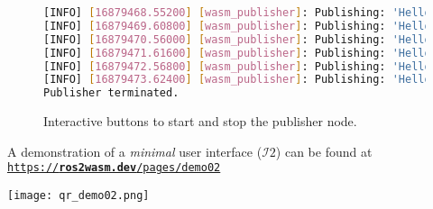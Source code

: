         \vspace{1em}
        \begin{figure}[htbp]
            \centering
            \vspace{1em}
            \begin{lstlisting}[language=Bash]
[INFO] [16879468.55200] [wasm_publisher]: Publishing: 'Hello there! 13'
[INFO] [16879469.60800] [wasm_publisher]: Publishing: 'Hello there! 14'
[INFO] [16879470.56000] [wasm_publisher]: Publishing: 'Hello there! 15'
[INFO] [16879471.61600] [wasm_publisher]: Publishing: 'Hello there! 16'
[INFO] [16879472.56800] [wasm_publisher]: Publishing: 'Hello there! 17'
[INFO] [16879473.62400] [wasm_publisher]: Publishing: 'Hello there! 18'
Publisher terminated.\end{lstlisting}
            \caption{Interactive buttons to start and stop the publisher node.}\label{fig:ui2}
        \end{figure}

        \vspace{1em}
        \begin{tcolorbox}[title=Example 5]
            \begin{minipage}[t]{0.87\linewidth}
                \vspace*{0.5\baselineskip}
                A demonstration of a \textit{minimal} user interface ($\mathcal{I}2$) can be found at \\ \href{https://ros2wasm.dev/pages/demo02/index.html}{\texttt{https://\textbf{ros2wasm.dev}/pages/demo02}}
            \end{minipage}\hfill%
            \begin{minipage}[t]{0.1\linewidth}
                \vspace*{0pt}
                \texttt{[image: qr\_demo02.png]}
            \end{minipage}
        \end{tcolorbox}


